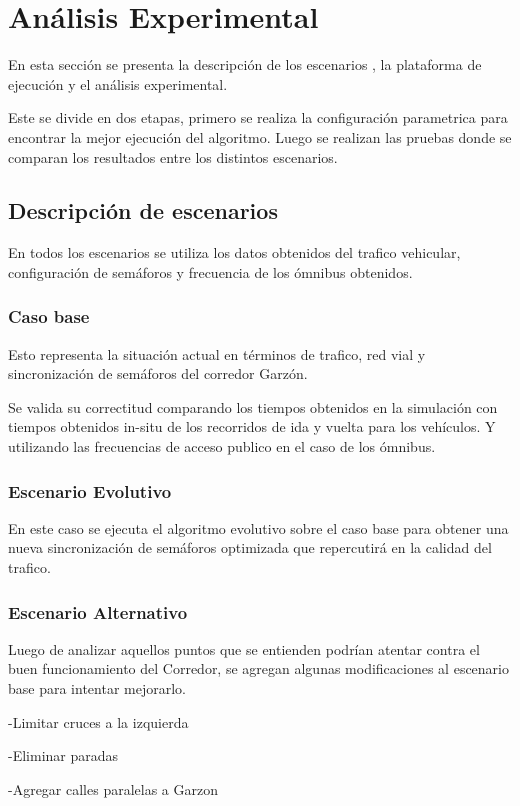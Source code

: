 \chapter{Análisis Experimental}
En esta sección se presenta la descripción de los escenarios , la plataforma de ejecución y el análisis experimental.

Este se divide en dos etapas, primero se realiza la configuración parametrica para encontrar la mejor ejecución del algoritmo. Luego se realizan las pruebas donde se comparan los resultados entre los distintos escenarios.


\section{Descripción de escenarios}
En todos los escenarios se utiliza los datos obtenidos del trafico vehicular, configuración de semáforos y frecuencia de los ómnibus obtenidos. 

\subsection{Caso base}
Esto representa la situación actual en términos de trafico, red vial y sincronización de semáforos del corredor Garzón. 

Se valida su correctitud comparando los tiempos obtenidos en la simulación con tiempos obtenidos in-situ de los recorridos de ida y vuelta para los vehículos. Y utilizando las frecuencias de acceso publico en el caso de los ómnibus.

\subsection{Escenario Evolutivo }
En este caso se ejecuta el algoritmo evolutivo sobre el caso base para obtener una nueva sincronización de semáforos optimizada que repercutirá en la calidad del trafico.

\subsection{Escenario Alternativo}
Luego de analizar aquellos puntos que se entienden podrían atentar contra el buen funcionamiento del Corredor, se agregan algunas modificaciones al escenario base para intentar mejorarlo. 

-Limitar cruces a la izquierda

-Eliminar paradas

-Agregar calles paralelas a Garzon

